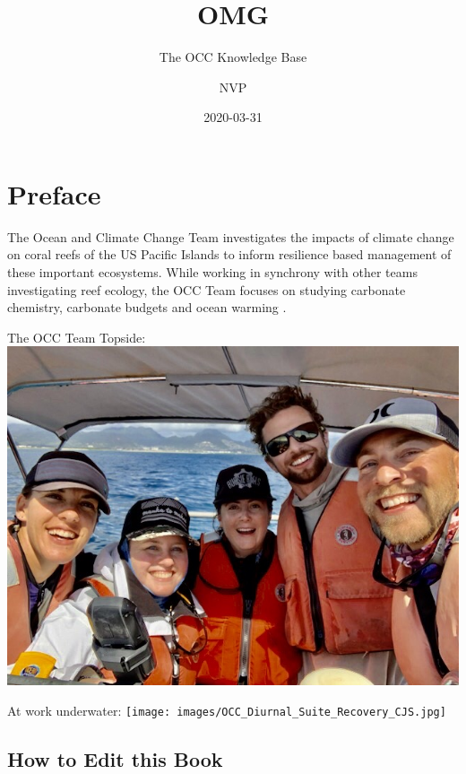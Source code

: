 \documentclass[]{book}
\title{OMG}
\subtitle{The OCC Knowledge Base}
\author{NVP}
\date{2020-03-31}
\begin{document}
\maketitle

{
\setcounter{tocdepth}{1}
\tableofcontents
}
\hypertarget{preface}{%
\chapter*{Preface}\label{preface}}

The Ocean and Climate Change Team investigates the impacts of climate change on coral reefs of the US Pacific Islands to inform resilience based management of these important ecosystems. While working in synchrony with other teams investigating reef ecology, the OCC Team focuses on studying carbonate chemistry, carbonate budgets and ocean warming .

The OCC Team Topside:
\includegraphics{images/OCC_Team_March_2020.jpg}

At work underwater:
\texttt{[image: images/OCC\_Diurnal\_Suite\_Recovery\_CJS.jpg]}

\hypertarget{how-to-edit-this-book}{%
\section*{How to Edit this Book}\label{how-to-edit-this-book}}
\end{document}
